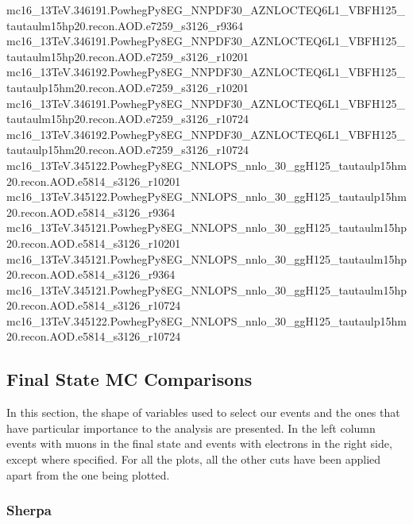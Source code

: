 {mc16\_13TeV.346191.PowhegPy8EG\_NNPDF30\_AZNLOCTEQ6L1\_VBFH125\_tautaulm15hp20.recon.AOD.e7259\_s3126\_r9364\newline  
mc16\_13TeV.346191.PowhegPy8EG\_NNPDF30\_AZNLOCTEQ6L1\_VBFH125\_tautaulm15hp20.recon.AOD.e7259\_s3126\_r10201\newline  
mc16\_13TeV.346192.PowhegPy8EG\_NNPDF30\_AZNLOCTEQ6L1\_VBFH125\_tautaulp15hm20.recon.AOD.e7259\_s3126\_r10201\newline  
mc16\_13TeV.346191.PowhegPy8EG\_NNPDF30\_AZNLOCTEQ6L1\_VBFH125\_tautaulm15hp20.recon.AOD.e7259\_s3126\_r10724\newline  
mc16\_13TeV.346192.PowhegPy8EG\_NNPDF30\_AZNLOCTEQ6L1\_VBFH125\_tautaulp15hm20.recon.AOD.e7259\_s3126\_r10724\newline  
mc16\_13TeV.345122.PowhegPy8EG\_NNLOPS\_nnlo\_30\_ggH125\_tautaulp15hm20.recon.AOD.e5814\_s3126\_r10201\newline  
mc16\_13TeV.345122.PowhegPy8EG\_NNLOPS\_nnlo\_30\_ggH125\_tautaulp15hm20.recon.AOD.e5814\_s3126\_r9364\newline  
mc16\_13TeV.345121.PowhegPy8EG\_NNLOPS\_nnlo\_30\_ggH125\_tautaulm15hp20.recon.AOD.e5814\_s3126\_r10201\newline  
mc16\_13TeV.345121.PowhegPy8EG\_NNLOPS\_nnlo\_30\_ggH125\_tautaulm15hp20.recon.AOD.e5814\_s3126\_r9364\newline  
mc16\_13TeV.345121.PowhegPy8EG\_NNLOPS\_nnlo\_30\_ggH125\_tautaulm15hp20.recon.AOD.e5814\_s3126\_r10724\newline  
mc16\_13TeV.345122.PowhegPy8EG\_NNLOPS\_nnlo\_30\_ggH125\_tautaulp15hm20.recon.AOD.e5814\_s3126\_r10724}	

\clearpage
\subsection{Final State MC Comparisons}\label{DistComparisons}
In this section, the shape of variables used to select our events and the ones that have particular importance to the analysis are presented. In the left column events with muons in the final state and events with electrons in the right side, except where specified. For all the plots, all the other cuts have been applied apart from the one being plotted.
\subsubsection{Sherpa}


